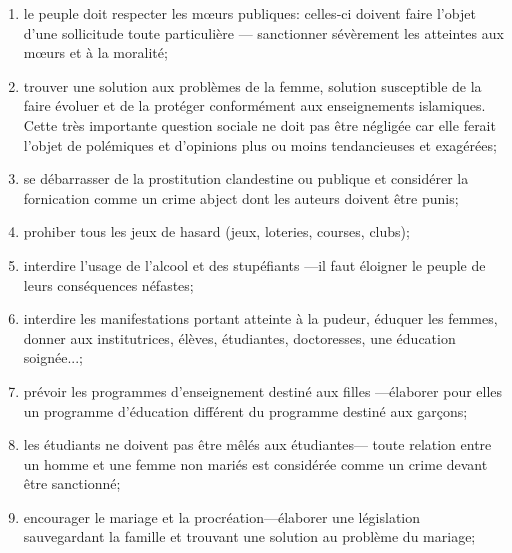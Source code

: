 \begin{enumerate}
\def\labelenumi{\arabic{enumi})}
\item
   
  le peuple doit respecter les mœurs publiques: celles‑ci doivent faire
  l'objet d'une sollicitude toute particulière --- sanctionner
  sévèrement les atteintes aux mœurs et à la moralité;
   
\item
   
  trouver une solution aux problèmes de la femme, solution susceptible
  de la faire évoluer et de la protéger conformément aux enseignements
  islamiques. Cette très importante question sociale ne doit pas être
  négligée car elle ferait l'objet de polémiques et d'opinions plus ou
  moins tendancieuses et exagérées;
   
\item
   
  se débarrasser de la prostitution clandestine ou publique et
  considérer la fornication comme un crime abject dont les auteurs
  doivent être punis;
   
\item
   
  prohiber tous les jeux de hasard (jeux, loteries, courses, clubs);
   
\item
   
  interdire l'usage de l'alcool et des stupéfiants ---il faut éloigner
  le peuple de leurs conséquences néfastes;
   
\item
   
  interdire les manifestations portant atteinte à la pudeur, éduquer les
  femmes, donner aux institutrices, élèves, étudiantes, doctoresses, une
  éducation soignée...;
   
\item
   
  prévoir les programmes d'enseignement destiné aux filles ---élaborer
  pour elles un programme d'éducation différent du programme destiné aux
  garçons;
   
\item
   
  les étudiants ne doivent pas être mêlés aux étudiantes--- toute
  relation entre un homme et une femme non mariés est consi­dérée comme
  un crime devant être sanctionné;
   
\item
   
  encourager le mariage et la procréation---élaborer une législation
  sauvegardant la famille et trouvant une solution au problème du
  mariage;
   

\end{enumerate}
